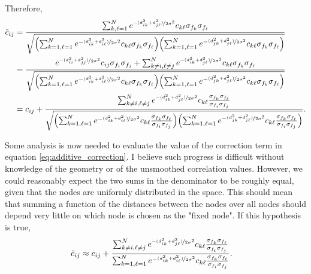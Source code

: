 \documentclass{article}
\begin{document}
Therefore,
\begin{align}
    \Tilde{c}_{ij} &= \frac{\sum_{k, \ell =1}^N e^{\nicefrac{-(d_{ik}^2+d_{j\ell}^2)}{2\sigma^2}}c_{k\ell}\sigma_{f_k}\sigma_{f_\ell}}{\sqrt{\qty(\sum_{k=1, \ell=1}^N e^{-\nicefrac{(d_{ik}^2+ d_{i\ell}^2)}{2\sigma^2}}c_{k\ell}\sigma_{f_k}\sigma_{f_\ell})\qty(\sum_{k=1, \ell=1}^N e^{-\nicefrac{(d_{jk}^2+ d_{j\ell}^2)}{2\sigma^2}}c_{k\ell}\sigma_{f_k}\sigma_{f_\ell})}} \nonumber \\
    &= \frac{e^{\nicefrac{-(d_{ii}^2+d_{jj}^2)}{2\sigma^2}}c_{ij}\sigma_{f_i}\sigma_{f_j} + \sum_{k\neq i, \ell \neq j}^N e^{\nicefrac{-(d_{ik}^2+d_{j\ell}^2)}{2\sigma^2}}c_{k\ell}\sigma_{f_k}\sigma_{f_\ell}}{\sqrt{\qty(\sum_{k=1, \ell=1}^N e^{-\nicefrac{(d_{ik}^2+ d_{i\ell}^2)}{2\sigma^2}}c_{k\ell}\sigma_{f_k}\sigma_{f_\ell})\qty(\sum_{k=1, \ell=1}^N e^{-\nicefrac{(d_{jk}^2+ d_{j\ell}^2)}{2\sigma^2}}c_{k\ell}\sigma_{f_k}\sigma_{f_\ell})}} \nonumber \\
    &= c_{ij}+\frac{\sum_{k\neq i, \ell \neq j}^N e^{\nicefrac{-(d_{ik}^2+d_{j\ell}^2)}{2\sigma^2}}c_{k\ell}\frac{\sigma_{f_k}\sigma_{f_\ell}}{\sigma_{f_i}\sigma_{f_j}}}{\sqrt{\qty(\sum_{k=1, \ell=1}^N e^{-\nicefrac{(d_{ik}^2+ d_{i\ell}^2)}{2\sigma^2}}c_{k\ell}\frac{\sigma_{f_k}\sigma_{f_\ell}}{\sigma_{f_i}\sigma_{f_j}})\qty(\sum_{k=1, \ell=1}^N e^{-\nicefrac{(d_{jk}^2+ d_{j\ell}^2)}{2\sigma^2}}c_{k\ell}\frac{\sigma_{f_k}\sigma_{f_\ell}}{\sigma_{f_i}\sigma_{f_j}})}}.
    \label{eq:additive_correction}
\end{align}
\begin{multicols}{2}
    Some analysis is now needed to evaluate the value of the correction term in equation \ref{eq:additive_correction}. I believe such progress is difficult without knowledge of the geometry or of the unsmoothed correlation values. However, we could reasonably expect the two sums in the denominator to be roughly equal, given that the nodes are uniformly distributed in the space. This should mean that summing a function of the distances between the nodes over all nodes should depend very little on which node is chosen as the "fixed node". If this hypothesis is true,
    \begin{align*}
        \Tilde{c}_{ij} &\approx c_{ij}+\frac{\sum_{k\neq i, \ell \neq j}^N e^{\nicefrac{-(d_{ik}^2+d_{j\ell}^2)}{2\sigma^2}}c_{k\ell}\frac{\sigma_{f_k}\sigma_{f_\ell}}{\sigma_{f_i}\sigma_{f_j}}}{\sum_{k=1, \ell=1}^N e^{-\nicefrac{(d_{ik}^2+ d_{i\ell}^2)}{2\sigma^2}}c_{k\ell}\frac{\sigma_{f_k}\sigma_{f_\ell}}{\sigma_{f_i}\sigma_{f_j}}}.
    \end{align*}
\end{multicols}

\end{document}

